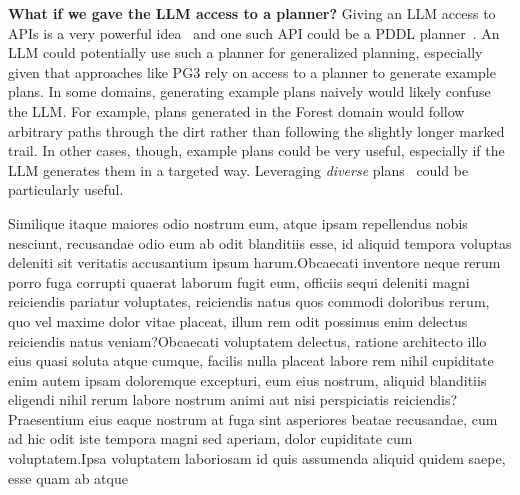 \documentclass[letterpaper]{article} %
\begin{document}
\textbf{What if we gave the LLM access to a planner?}
Giving an LLM access to APIs is a very powerful idea~\cite{schick2023toolformer} and one such API could be a PDDL planner~\cite{liu2023llm}.
An LLM could potentially use such a planner for generalized planning, especially given that approaches like PG3 rely on access to a planner to generate example plans.
In some domains, generating example plans naively would likely confuse the LLM.
For example, plans generated in the Forest domain would follow arbitrary paths through the dirt rather than following the slightly longer marked trail.
In other cases, though, example plans could be very useful, especially if the LLM generates them in a targeted way.
Leveraging \emph{diverse} plans~\cite{sohrabi2016finding,katz2020reshaping} could be particularly useful.



Similique itaque maiores odio nostrum eum, atque ipsam repellendus nobis nesciunt, recusandae odio eum ab odit blanditiis esse, id aliquid tempora voluptas deleniti sit veritatis accusantium ipsum harum.Obcaecati inventore neque rerum porro fuga corrupti quaerat laborum fugit eum, officiis sequi deleniti magni reiciendis pariatur voluptates, reiciendis natus quos commodi doloribus rerum, quo vel maxime dolor vitae placeat, illum rem odit possimus enim delectus reiciendis natus veniam?Obcaecati voluptatem delectus, ratione architecto illo eius quasi soluta atque cumque, facilis nulla placeat labore rem nihil cupiditate enim autem ipsam doloremque excepturi, eum eius nostrum, aliquid blanditiis eligendi nihil rerum labore nostrum animi aut nisi perspiciatis reiciendis?Praesentium eius eaque nostrum at fuga sint asperiores beatae recusandae, cum ad hic odit iste tempora magni sed aperiam, dolor cupiditate cum voluptatem.Ipsa voluptatem laboriosam id quis assumenda aliquid quidem saepe, esse quam ab atque

\end{document}
